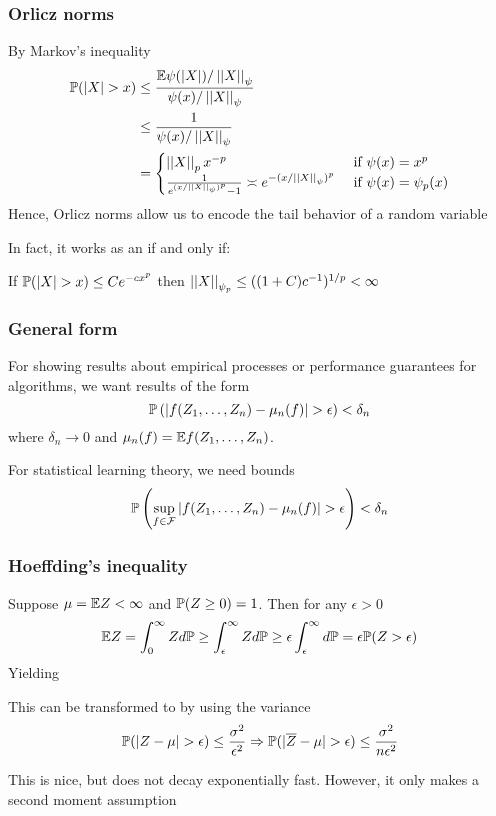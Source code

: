 \documentclass[12pt]{beamer}
\begin{document}
\begin{frame}[fragile]
\frametitle{Orlicz norms}
By Markov's inequality
\begin{align*}
\P(|X| > x) & \leq \frac{\E \psi(|X|)/\norm{X}_{\psi}}{\psi(x)/\norm{X}_{\psi}} \\
& \leq
\frac{1}{\psi(x)/\norm{X}_{\psi}} \\
& =
\begin{cases}
\norm{X}_px^{-p} & \textrm{ if } \psi(x) = x^p \\
\frac{1}{e^{(x/\norm{X}_{\psi})^p}-1}  \asymp e^{-(x/\norm{X}_{\psi})^{p}}&  \textrm{ if } \psi(x) = \psi_p(x)
\end{cases}
\end{align*}
Hence, Orlicz norms allow us to encode the tail behavior of a random variable

\vsp
In fact, it works as an if and only if:

\vsp
If $\P(|X| > x) \leq C e^{-cx^p}$ then $\norm{X}_{\psi_p} \leq ( (1 + C)c^{-1})^{1/p} < \infty$
\end{frame}


\begin{frame}[fragile]
\frametitle{General form}
For showing results about empirical processes or performance guarantees for algorithms, we want results of the form
\[
\P\left(|f(Z_1,\ldots,Z_n) - \mu_n(f)| > \epsilon\right) < \delta_n
\]
where $\delta_n\rightarrow 0$ and $\mu_n(f) = \E f(Z_1,\ldots,Z_n)$.

\vsp
For statistical learning theory, we need  bounds
\[
\P\left(\sup_{f \in \F} |f(Z_1,\ldots,Z_n) - \mu_n(f)| > \epsilon\right) < \delta_n
\]

\end{frame}

\begin{frame}[fragile]
\frametitle{Hoeffding's inequality}
Suppose $\mu = \E Z < \infty$ and $\P(Z \geq 0) = 1$.  Then for any $\epsilon > 0$
\[
\E Z = \int_0^\infty Z d\P \geq \int_\epsilon^\infty Z d\P \geq \epsilon \int_\epsilon^\infty  d\P = \epsilon \P(Z > \epsilon)
\]
Yielding 

\vsp
This can be transformed to  by using the variance
\[
\P(|Z - \mu| > \epsilon) \leq \frac{\sigma^2}{\epsilon^2} \Rightarrow \P(|\overline{Z} - \mu| > \epsilon) \leq \frac{\sigma^2}{n\epsilon^2}
\]

 This is nice, but does not decay exponentially fast.  However, it only makes a second moment
assumption
\end{frame}
\end{document}

